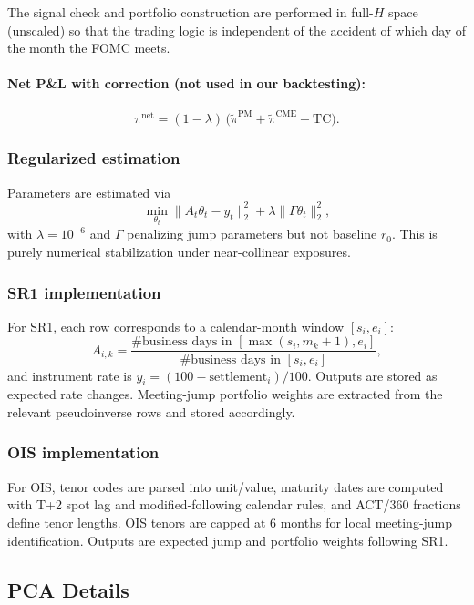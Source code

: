 The signal check and portfolio construction are performed in full-$H$
space (unscaled) so that the trading logic is independent of the
accident of which day of the month the FOMC meets. 


\paragraph{Net P\&L with correction (not used in our backtesting):}
\begin{equation}
  \pi^\text{net} = (1-\lambda)\,\bigl(\tilde{\pi}^\text{PM}
                   + \tilde{\pi}^\text{CME} - \text{TC}\bigr).
  \label{eq:net_pnl}
\end{equation}

\subsubsection*{Regularized estimation}
Parameters are estimated via
\[
\min_{\theta_t}\|A_t\theta_t-y_t\|_2^2 + \lambda\|\Gamma\theta_t\|_2^2,
\]
with $\lambda=10^{-6}$ and $\Gamma$ penalizing jump parameters but not baseline
$r_0$. This is purely numerical stabilization under near-collinear exposures.

\subsubsection*{SR1 implementation}
For SR1, each row corresponds to a calendar-month window $[s_i,e_i]$:
\[
A_{i,k}=\frac{\#\text{business days in }[\max(s_i,m_k+1),e_i]}
{\#\text{business days in }[s_i,e_i]},
\]
and instrument rate is $y_i=(100-\text{settlement}_i)/100$. Outputs are
stored as expected rate changes. Meeting-jump portfolio weights are extracted
from the relevant pseudoinverse rows and stored accordingly.

\subsubsection*{OIS implementation}
For OIS, tenor codes are parsed into unit/value, maturity dates are computed
with T+2 spot lag and modified-following calendar rules, and ACT/360 fractions
define tenor lengths. OIS tenors are capped at 6 months for local meeting-jump
identification. Outputs are expected jump and portfolio weights following SR1.

\subsection{PCA Details}
\label{app:statarb_panel_pca}
